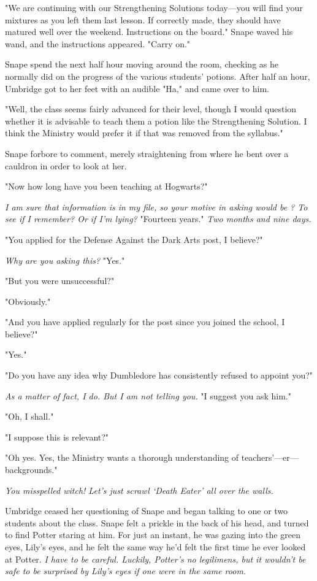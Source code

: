 "We are continuing with our Strengthening Solutions today—you will find your mixtures as you left them last lesson. If correctly made, they should have matured well over the weekend. Instructions on the board." Snape waved his wand, and the instructions appeared. "Carry on."

Snape spend the next half hour moving around the room, checking as he normally did on the progress of the various students' potions. After half an hour, Umbridge got to her feet with an audible "Ha," and came over to him.

"Well, the class seems fairly advanced for their level, though I would question whether it is advisable to teach them a potion like the Strengthening Solution. I think the Ministry would prefer it if that was removed from the syllabus."

Snape forbore to comment, merely straightening from where he bent over a cauldron in order to look at her.

"Now{\el} how long have you been teaching at Hogwarts?"

\emph{I am sure that information is in my file, so your motive in asking would be{\el} ? To see if I remember? Or if I'm lying?} "Fourteen years." \emph{Two months and nine days.}

"You applied for the Defense Against the Dark Arts post, I believe?"

\emph{Why are you asking this?} "Yes."

"But you were unsuccessful?"

"Obviously."

"And you have applied regularly for the post since you joined the school, I believe?"

"Yes."

"Do you have any idea why Dumbledore has consistently refused to appoint you?"

\emph{As a matter of fact, I do. But I am not telling you.} "I suggest you ask him."

"Oh, I shall."

"I suppose this is relevant?"

"Oh yes. Yes, the Ministry wants a thorough understanding of teachers'—er—backgrounds."

\emph{You misspelled witch! Let's just scrawl `Death Eater' all over the walls.}

Umbridge ceased her questioning of Snape and began talking to one or two students about the class. Snape felt a prickle in the back of his head, and turned to find Potter staring at him. For just an instant, he was gazing into the green eyes, Lily's eyes, and he felt the same way he'd felt the first time he ever looked at Potter. \emph{I have to be careful. Luckily, Potter's no legilimens, but it wouldn't be safe to be surprised by Lily's eyes if one were in the same room.}

